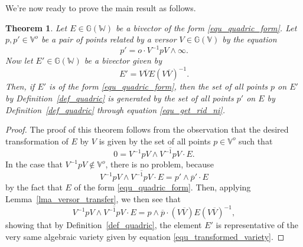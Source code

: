 \documentclass{birkjour}
\newtheorem{thm}{Theorem}[section]
\theoremstyle{definition}
\theoremstyle{remark}
\numberwithin{equation}{section}
\newcommand{\G}{\mathbb{G}}
\newcommand{\V}{\mathbb{V}}
\newcommand{\W}{\mathbb{W}}
\newcommand{\nvao}{o}
\newcommand{\nvai}{\infty}
\begin{document}
We're now ready to prove the main result as follows.
\begin{thm}\label{thm_quadric_transform}
Let $E\in\G(\W)$ be a bivector of the form \eqref{equ_quadric_form}.
Let $p,p'\in\V^o$ be a pair of points related by a versor $V\in\G(\V)$ by
the equation
\begin{equation}\label{equ_get_rid_ni}
p' = \nvao\cdot V^{-1}pV\wedge\nvai.
\end{equation}
Now let $E'\in\G(\W)$ be a bivector given by
\begin{equation}\label{equ_transformed_surface}
E' = V\overline{V}E(V\overline{V})^{-1}.
\end{equation}
Then, if $E'$ is of the form \eqref{equ_quadric_form}, then the
set of all points $p$ on $E'$ by Definition~\ref{def_quadric} is
generated by the set of all points $p'$ on $E$ by Definition~\ref{def_quadric}
through equation \eqref{equ_get_rid_ni}.
\end{thm}
\begin{proof}
The proof of this theorem follows from the observation that the desired transformation
of $E$ by $V$ is given by the set of all points $p\in\V^o$ such that
\begin{equation}\label{equ_transformed_variety}
0 = V^{-1}pV\wedge\overline{V^{-1}pV}\cdot E.
\end{equation}
In the case that $V^{-1}pV\not\in\V^o$, there is no problem, because
\begin{equation}
V^{-1}pV\wedge\overline{V^{-1}pV}\cdot E = p'\wedge\overline{p}'\cdot E
\end{equation}
by the fact that $E$ of the form \eqref{equ_quadric_form}.
Then, applying Lemma~\ref{lma_versor_transfer}, we then see that
\begin{equation}
V^{-1}pV\wedge\overline{V^{-1}pV}\cdot E = p\wedge\overline{p}\cdot (V\overline{V})E(V\overline{V})^{-1},
\end{equation}
showing that by Definition~\ref{def_quadric}, the element $E'$ is representative of the very same
algebraic variety given by equation \eqref{equ_transformed_variety}.
\end{proof}
\end{document}
